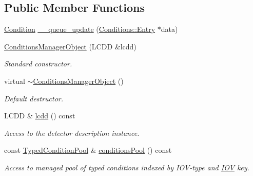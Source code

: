 \subsection*{Public Member Functions}
\begin{DoxyCompactItemize}
\item 
\hyperlink{class_d_d4hep_1_1_conditions_1_1_condition}{Condition} \hyperlink{class_d_d4hep_1_1_conditions_1_1_conditions_manager_object_ad22280768d433c68fabe8709a1bb6fda}{\_\-\_\-queue\_\-update} (\hyperlink{class_d_d4hep_1_1_conditions_1_1_entry}{Conditions::Entry} $\ast$data)
\item 
\hyperlink{class_d_d4hep_1_1_conditions_1_1_conditions_manager_object_adff4e6fe39f5057945ff8ac0634aad2e}{ConditionsManagerObject} (LCDD \&lcdd)
\begin{DoxyCompactList}\small\item\em Standard constructor. \item\end{DoxyCompactList}\item 
virtual \hyperlink{class_d_d4hep_1_1_conditions_1_1_conditions_manager_object_a78747f9367ce2e43b3d0ee4214eb9ab3}{$\sim$ConditionsManagerObject} ()
\begin{DoxyCompactList}\small\item\em Default destructor. \item\end{DoxyCompactList}\item 
LCDD \& \hyperlink{class_d_d4hep_1_1_conditions_1_1_conditions_manager_object_ace8f542e07423795f472dac6e606121e}{lcdd} () const 
\begin{DoxyCompactList}\small\item\em Access to the detector description instance. \item\end{DoxyCompactList}\item 
const \hyperlink{class_d_d4hep_1_1_conditions_1_1_conditions_manager_object_a1617c134372fbb79d06990707f19bb0c}{TypedConditionPool} \& \hyperlink{class_d_d4hep_1_1_conditions_1_1_conditions_manager_object_a216b4a65afcc3533f3b8dd1af996dc8c}{conditionsPool} () const 
\begin{DoxyCompactList}\small\item\em Access to managed pool of typed conditions indexed by IOV-\/type and \hyperlink{class_d_d4hep_1_1_i_o_v}{IOV} key. \item\end{DoxyCompactList}\item 

\end{DoxyCompactItemize}
